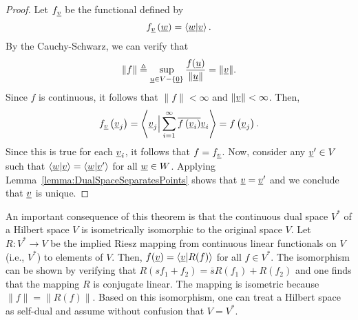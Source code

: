 \begin{proof}
Let $f_{\underline{v}}$ be the functional defined by
\begin{equation*}
f_{\underline{v}} \left( \underline{w} \right) = \left\langle \underline{w} | \underline{v} \right\rangle .
\end{equation*}
By the Cauchy-Schwarz, we can verify that
\[ \| f \| \triangleq \sup_{\underline{u}\in V - \{ \underline{0} \}} \frac{f(\underline{u})}{\| \underline{u} \|} = \| \underline{v} \|. \]
Since $f$ is continuous, it follows that $\| f \| < \infty$ and $\| \underline{v} \| < \infty$.
Then, 
\begin{equation*}
f_{\underline{v}} \left( \underline{v}_j \right) = \left\langle \underline{v}_j \Big| 
\sum_{i=1}^\infty \overline{f \left( \underline{v}_i \right)} \underline{v}_i \right\rangle
= f \left( \underline{v}_j \right) .
\end{equation*}
Since this is true for each $\underline{v}_i$, it follows that $f = f_{\underline{v}}$.
Now, consider any $\underline{v}' \in V$ such that $\left\langle \underline{w} | \underline{v} \right\rangle = \left\langle \underline{w} | \underline{v}' \right\rangle$ for all $\underline{w} \in W$.
Applying Lemma~\ref{lemma:DualSpaceSeparatesPoints} shows that $\underline{v} = \underline{v}'$ and we conclude that $\underline{v}$ is unique.
\end{proof}

An important consequence of this theorem is that the continuous dual space $V^*$ of a Hilbert space $V$ is isometrically isomorphic to the original space $V$.
Let $R: V^* \rightarrow V$ be the implied Riesz mapping from continuous linear functionals on $V$ (i.e., $V^*$) to elements of $V$.
Then, $f(\underline{v}) = \langle \underline{v} | R( f ) \rangle$ for all $f \in V^*$.
The isomorphism can be shown by verifying that $R( s f_1 + f_2 ) = \overline{s} R(f_1) + R(f_2)$ and one finds that the mapping $R$ is conjugate linear.
The mapping is isometric because $\| f \| = \| R(f) \|$.
Based on this isomorphism, one can treat a Hilbert space as self-dual and assume without confusion that $V=V^*$.

